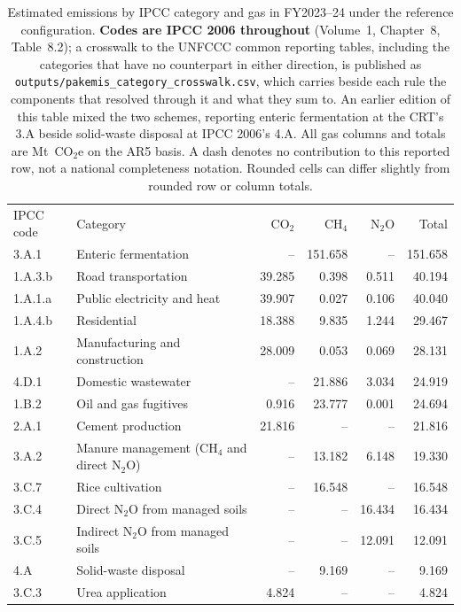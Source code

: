 \documentclass[essd]{copernicus}
\begin{document}
\begin{table}[t]
\caption{Estimated emissions by IPCC category and gas in FY2023--24 under the reference configuration. \textbf{Codes are IPCC 2006 throughout} (Volume~1, Chapter~8, Table~8.2); a crosswalk to the UNFCCC common reporting tables, including the categories that have no counterpart in either direction, is published as \texttt{outputs/pakemis\_category\_crosswalk.csv}, which carries beside each rule the components that resolved through it and what they sum to. An earlier edition of this table mixed the two schemes, reporting enteric fermentation at the CRT's 3.A beside solid-waste disposal at IPCC 2006's 4.A. All gas columns and totals are Mt~CO$_2$e on the AR5 basis. A dash denotes no contribution to this reported row, not a national completeness notation. Rounded cells can differ slightly from rounded row or column totals.}
\label{tab:categories}
\small
\begin{tabular}{lp{}rrrr}
\tophline
IPCC code & Category & CO$_2$ & CH$_4$ & N$_2$O & Total \\
\middlehline
3.A.1 & Enteric fermentation & -- & 151.658 & -- & 151.658 \\
1.A.3.b & Road transportation & 39.285 & 0.398 & 0.511 & 40.194 \\
1.A.1.a & Public electricity and heat & 39.907 & 0.027 & 0.106 & 40.040 \\
1.A.4.b & Residential & 18.388 & 9.835 & 1.244 & 29.467 \\
1.A.2 & Manufacturing and construction & 28.009 & 0.053 & 0.069 & 28.131 \\
4.D.1 & Domestic wastewater & -- & 21.886 & 3.034 & 24.919 \\
1.B.2 & Oil and gas fugitives & 0.916 & 23.777 & 0.001 & 24.694 \\
2.A.1 & Cement production & 21.816 & -- & -- & 21.816 \\
3.A.2 & Manure management (CH$_4$ and direct N$_2$O) & -- & 13.182 & 6.148 & 19.330 \\
3.C.7 & Rice cultivation & -- & 16.548 & -- & 16.548 \\
3.C.4 & Direct N$_2$O from managed soils & -- & -- & 16.434 & 16.434 \\
3.C.5 & Indirect N$_2$O from managed soils & -- & -- & 12.091 & 12.091 \\
4.A & Solid-waste disposal & -- & 9.169 & -- & 9.169 \\
3.C.3 & Urea application & 4.824 & -- & -- & 4.824 \\

\end{tabular}
\end{table}
\end{document}
